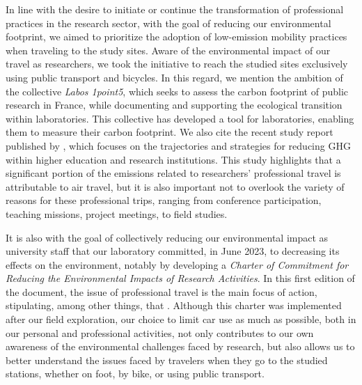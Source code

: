 \begin{refsegment}
In line with the desire to initiate or continue the transformation of professional practices in the research sector, with the goal of reducing our environmental footprint, we aimed to prioritize the adoption of low-emission mobility practices when traveling to the study sites. Aware of the environmental impact of our travel as researchers, we took the initiative to reach the studied sites exclusively using public transport and bicycles. In this regard, we mention the ambition of the collective \textsl{Labos 1point5}, which seeks to assess the carbon footprint of public research in France, while documenting and supporting the ecological transition within laboratories. This collective has developed a tool for laboratories, enabling them to measure their carbon footprint. We also cite the recent study report published by \textcolor{blue}{\textcite[11]{labos_1point5_objectifs_2023}}, which focuses on the trajectories and strategies for reducing \acrfull{GHG} within higher education and research institutions. This study highlights that a significant portion of the emissions related to researchers' professional travel is attributable to air travel, but it is also important not to overlook the variety of reasons for these professional trips, ranging from conference participation, teaching missions, project meetings, to field studies.%

It is also with the goal of collectively reducing our environmental impact as university staff that our laboratory committed, in June 2023, to decreasing its effects on the environment, notably by developing a \textsl{Charter of Commitment for Reducing the Environmental Impacts of Research Activities}. In this first edition of the document, the issue of professional travel is the main focus of action, stipulating, among other things, that . Although this charter was implemented after our field exploration, our choice to limit car use as much as possible, both in our personal and professional activities, not only contributes to our own awareness of the environmental challenges faced by research, but also allows us to better understand the issues faced by travelers when they go to the studied stations, whether on foot, by bike, or using public transport.%


\end{refsegment}
